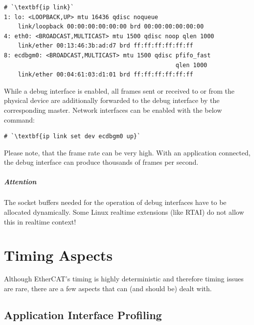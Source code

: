 \documentclass[a4paper,12pt,BCOR=6mm,bibtotoc,idxtotoc]{scrbook}
\begin{document}
\begin{lstlisting}
# `\textbf{ip link}`
1: lo: <LOOPBACK,UP> mtu 16436 qdisc noqueue
    link/loopback 00:00:00:00:00:00 brd 00:00:00:00:00:00
4: eth0: <BROADCAST,MULTICAST> mtu 1500 qdisc noop qlen 1000
    link/ether 00:13:46:3b:ad:d7 brd ff:ff:ff:ff:ff:ff
8: ecdbgm0: <BROADCAST,MULTICAST> mtu 1500 qdisc pfifo_fast
                                                 qlen 1000
    link/ether 00:04:61:03:d1:01 brd ff:ff:ff:ff:ff:ff
\end{lstlisting}

While a debug interface is enabled, all frames sent or received to or from the
physical device are additionally forwarded to the debug interface by the
corresponding master. Network interfaces can be enabled with the below
command:

\begin{lstlisting}
# `\textbf{ip link set dev ecdbgm0 up}`
\end{lstlisting}

Please note, that the frame rate can be very high. With an application
connected, the debug interface can produce thousands of frames per second.

\paragraph{Attention} The socket buffers needed for the operation of debug
interfaces have to be allocated dynamically. Some Linux realtime extensions
(like RTAI) do not allow this in realtime context!


\chapter{Timing Aspects}
\label{sec:timing}

Although EtherCAT's timing is highly deterministic and therefore timing issues
are rare, there are a few aspects that can (and should be) dealt with.


\section{Application Interface Profiling}
\label{sec:timing-profile}
\end{document}
